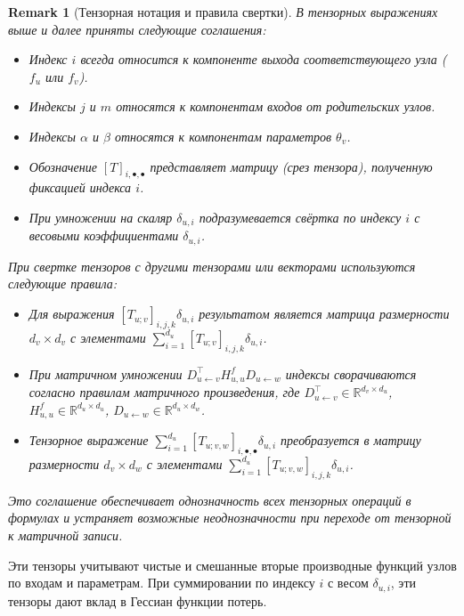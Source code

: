 \documentclass[11pt]{article}
\newtheorem{remark}{Remark}
\begin{document}
\begin{remark}[Тензорная нотация и правила свертки]
  В тензорных выражениях выше и далее приняты следующие соглашения:
  \begin{itemize}
    \item Индекс $i$ всегда относится к компоненте выхода соответствующего узла ($f_u$ или $f_v$).
    \item Индексы $j$ и $m$ относятся к компонентам входов от родительских узлов.
    \item Индексы $\alpha$ и $\beta$ относятся к компонентам параметров $\theta_v$.
    \item Обозначение $[T]_{i,\bullet,\bullet}$ представляет матрицу (срез тензора), полученную фиксацией индекса $i$.
    \item При умножении на скаляр $\delta_{u,i}$ подразумевается свёртка по индексу $i$ с весовыми
      коэффициентами $\delta_{u,i}$.
  \end{itemize}

  При свертке тензоров с другими тензорами или векторами используются следующие правила:
  \begin{itemize}
    \item Для выражения $[T_{u;v}]_{i,j,k}\delta_{u,i}$ результатом является матрица размерности $d_v \times
      d_v$ с элементами $\sum_{i=1}^{d_u}[T_{u;v}]_{i,j,k}\delta_{u,i}$.
    \item При матричном умножении $D_{u\gets v}^\top H^f_{u,u} D_{u\gets w}$ индексы сворачиваются согласно
      правилам матричного произведения, где $D_{u\gets v}^\top \in \mathbb{R}^{d_v \times d_u}$, $H^f_{u,u}
      \in \mathbb{R}^{d_u \times d_u}$, $D_{u\gets w} \in \mathbb{R}^{d_u \times d_w}$.
    \item Тензорное выражение $\sum_{i=1}^{d_u}[T_{u;v,w}]_{i,\bullet,\bullet}\delta_{u,i}$ преобразуется в
      матрицу размерности $d_v \times d_w$ с элементами $\sum_{i=1}^{d_u}[T_{u;v,w}]_{i,j,k}\delta_{u,i}$.
  \end{itemize}

  Это соглашение обеспечивает однозначность всех тензорных операций в формулах и устраняет возможные
  неоднозначности при переходе от тензорной к матричной записи.
\end{remark}

Эти тензоры учитывают чистые и смешанные вторые производные функций узлов по входам и параметрам. При
суммировании по индексу $i$ с весом $\delta_{u,i}$, эти тензоры дают вклад в Гессиан функции потерь.
\end{document}
